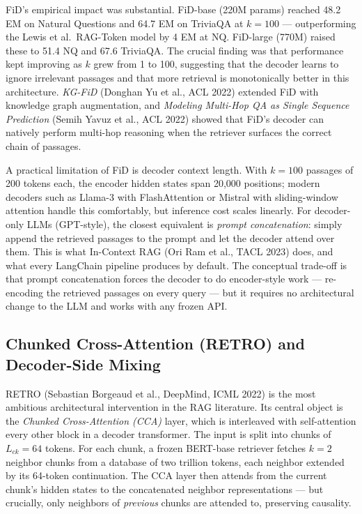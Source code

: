 \documentclass{article}
\begin{document}
FiD's empirical impact was substantial. FiD-base (220M params) reached 48.2 EM on Natural Questions and 64.7 EM on TriviaQA at \(k=100\) --- outperforming the Lewis et al.~RAG-Token model by 4 EM at NQ. FiD-large (770M) raised these to 51.4 NQ and 67.6 TriviaQA. The crucial finding was that performance kept improving as \(k\) grew from 1 to 100, suggesting that the decoder learns to ignore irrelevant passages and that more retrieval is monotonically better in this architecture. \emph{KG-FiD} (Donghan Yu et al., ACL 2022) extended FiD with knowledge graph augmentation, and \emph{Modeling Multi-Hop QA as Single Sequence Prediction} (Semih Yavuz et al., ACL 2022) showed that FiD's decoder can natively perform multi-hop reasoning when the retriever surfaces the correct chain of passages.

A practical limitation of FiD is decoder context length. With \(k=100\) passages of 200 tokens each, the encoder hidden states span 20,000 positions; modern decoders such as Llama-3 with FlashAttention or Mistral with sliding-window attention handle this comfortably, but inference cost scales linearly. For decoder-only LLMs (GPT-style), the closest equivalent is \emph{prompt concatenation}: simply append the retrieved passages to the prompt and let the decoder attend over them. This is what In-Context RAG (Ori Ram et al., TACL 2023) does, and what every LangChain pipeline produces by default. The conceptual trade-off is that prompt concatenation forces the decoder to do encoder-style work --- re-encoding the retrieved passages on every query --- but it requires no architectural change to the LLM and works with any frozen API.

\subsection{Chunked Cross-Attention (RETRO) and Decoder-Side Mixing}\label{chunked-cross-attention-retro-and-decoder-side-mixing}

RETRO (Sebastian Borgeaud et al., DeepMind, ICML 2022) is the most ambitious architectural intervention in the RAG literature. Its central object is the \emph{Chunked Cross-Attention (CCA)} layer, which is interleaved with self-attention every other block in a decoder transformer. The input is split into chunks of \(L_{ck} = 64\) tokens. For each chunk, a frozen BERT-base retriever fetches \(k=2\) neighbor chunks from a database of two trillion tokens, each neighbor extended by its 64-token continuation. The CCA layer then attends from the current chunk's hidden states to the concatenated neighbor representations --- but crucially, only neighbors of \emph{previous} chunks are attended to, preserving causality.
\end{document}
